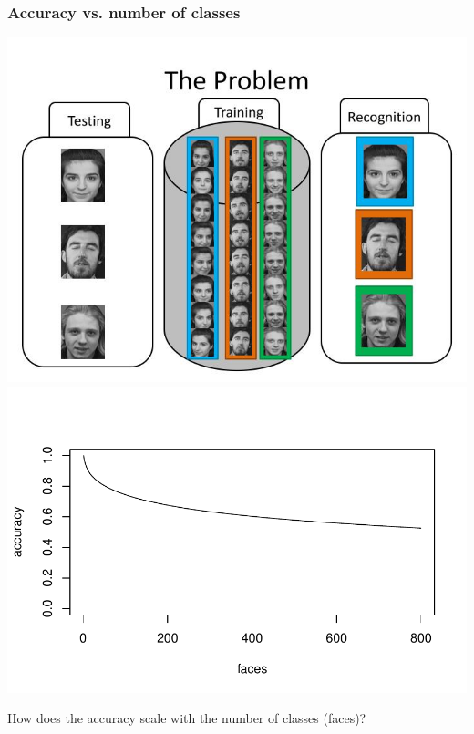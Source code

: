 \documentclass{beamer}
\begin{document}
\begin{frame}
\frametitle{Accuracy vs. number of classes}
\begin{center}
\includegraphics[scale = 0.2]{face_rec_the-problem-n.jpg}\pause
\hspace{0.2in}
\includegraphics[scale = 0.3]{../facerec/acc_plot1.pdf}\pause
\end{center}

How does the accuracy scale with the number of classes (faces)?
\end{frame}
\end{document}
